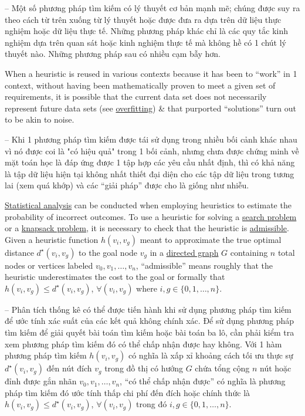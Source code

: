 \documentclass{article}
\begin{document}
-- Một số phương pháp tìm kiếm có lý thuyết cơ bản mạnh mẽ; chúng được suy ra theo cách từ trên xuống từ lý thuyết hoặc được đưa ra dựa trên dữ liệu thực nghiệm hoặc dữ liệu thực tế. Những phương pháp khác chỉ là các quy tắc kinh nghiệm dựa trên quan sát hoặc kinh nghiệm thực tế mà không hề có 1 chút lý thuyết nào. Những phương pháp sau có nhiều cạm bẫy hơn.

When a heuristic is reused in various contexts because it has been to ``work'' in 1 context, without having been mathematically proven to meet a given set of requirements, it is possible that the current data set does not necessarily represent future data sets (see \href{https://en.wikipedia.org/wiki/Overfitting}{overfitting}) \& that purported ``solutions'' turn out to be akin to noise.

-- Khi 1 phương pháp tìm kiếm được tái sử dụng trong nhiều bối cảnh khác nhau vì nó được coi là "có hiệu quả" trong 1 bối cảnh, nhưng chưa được chứng minh về mặt toán học là đáp ứng được 1 tập hợp các yêu cầu nhất định, thì có khả năng là tập dữ liệu hiện tại không nhất thiết đại diện cho các tập dữ liệu trong tương lai (xem quá khớp) và các ``giải pháp'' được cho là giống như nhiễu.

\href{https://en.wikipedia.org/wiki/Statistical_analysis}{Statistical analysis} can be conducted when employing heuristics to estimate the probability of incorrect outcomes. To use a heuristic for solving a \href{https://en.wikipedia.org/wiki/Search_problem}{search problem} or a \href{https://en.wikipedia.org/wiki/Knapsack_problem}{knapsack problem}, it is necessary to check that the heuristic is \href{https://en.wikipedia.org/wiki/Admissible_heuristic}{admissible}. Given a heuristic function $h(v_i,v_g)$ meant to approximate the true optimal distance $d^\star(v_i,v_g)$ to the goal node $v_g$ in a \href{https://en.wikipedia.org/wiki/Directed_graph}{directed graph} $G$ containing $n$ total nodes or vertices labeled $v_0,v_1,\ldots,v_n$, ``admissible'' means roughly that the heuristic underestimates the cost to the goal or formally that $h(v_i,v_g)\le d^\star(v_i,v_g)$, $\forall(v_i,v_g)$ where $i,g\in\{0,1,\ldots,n\}$.

-- Phân tích thống kê có thể được tiến hành khi sử dụng phương pháp tìm kiếm để ước tính xác suất của các kết quả không chính xác. Để sử dụng phương pháp tìm kiếm để giải quyết bài toán tìm kiếm hoặc bài toán ba lô, cần phải kiểm tra xem phương pháp tìm kiếm đó có thể chấp nhận được hay không. Với 1 hàm phương pháp tìm kiếm $h(v_i,v_g)$ có nghĩa là xấp xỉ khoảng cách tối ưu thực sự $d^\star(v_i,v_g)$ đến nút đích $v_g$ trong đồ thị có hướng $G$ chứa tổng cộng $n$ nút hoặc đỉnh được gắn nhãn $v_0,v_1,\ldots,v_n$, ``có thể chấp nhận được'' có nghĩa là phương pháp tìm kiếm đó ước tính thấp chi phí đến đích hoặc chính thức là $h(v_i,v_g)\le d^\star(v_i,v_g)$, $\forall(v_i,v_g)$ trong đó $i,g\in\{0,1,\ldots,n\}$.
\end{document}
